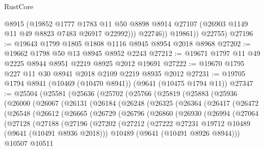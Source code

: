 \begin{lexlean}{RustCore}
\begin{coremodule}
                @8915
                (@19852
                  @1777
                  @1783
                  @11
                  @50
                  @8898
                  @8914
                  @27107
                  (@26903 @1149 @11 @49 @8823 @7483 @26917 @22992)))
              @22746))
          @19861))
      @22755)
@27196 := @19643 @1799 @1805 @1808 @1116 @8945 @8954 @2018 @8968
@27202 := @19662 @1798 @50 @13 @8945 @8952 @2243
@27212 := @19671 @1797 @11 @49 @2225 @8944 @8951 @2219 @8925 @2012 @19691
@27222 := @19670 @1795 @227 @11 @30 @8941 @2018 @2109 @2219 @8935 @2012
@27231 := @19705 @1794 @8941 (@10469 (@10470 @8941)) (@9641 (@10475 @1794 @11))
@27347 := @25504
    (@25581
      (@25636
        (@25702
          (@25766
            (@25819
              (@25883
                (@25936
                  (@26000
                    (@26067
                      (@26131
                        (@26184
                          (@26248
                            (@26325
                              (@26364
                                (@26417
                                  (@26472
                                    (@26548
                                      (@26612
                                        (@26665
                                          (@26729
                                            (@26796
                                              (@26860
                                                (@26930
                                                  (@26994
                                                    (@27064
                                                      (@27128
                                                        (@27188
                                                          (@27196
                                                            (@27202
                                                              (@27212
                                                                (@27222
                                                                  @27231
                                                                  @19712
                                                                  @10489
                                                                  (@9641 (@10491 @8936 @2018)))
                                                                @10489
                                                                (@9641 (@10491 @8926 @8944)))
                                                              @10507
                                                              @10511

\end{coremodule}
\end{lexlean}
